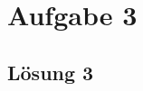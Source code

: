 \documentclass[main.tex]{subfiles}
\begin{document}
\section{Aufgabe 3}

\subsection{Lösung 3}
\end{document}
